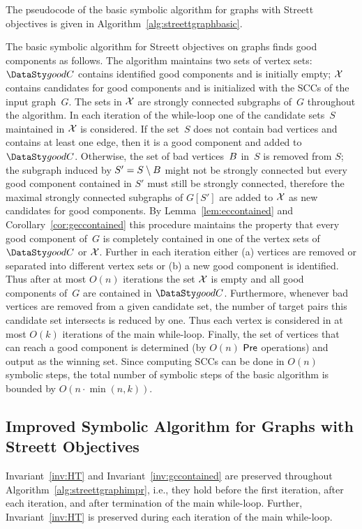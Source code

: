 The pseudocode of the basic symbolic algorithm for graphs with Streett
objectives is given in Algorithm~\ref{alg:streettgraphbasic}.

The basic symbolic algorithm for Streett objectives on graphs finds good components as follows.
The algorithm maintains two sets of vertex sets: $\goodC$ contains identified 
good components and is initially empty; $\mathcal{X}$ contains candidates for 
good components and is initialized with the SCCs of the input graph~$G$. The sets 
in $\mathcal{X}$ are strongly connected subgraphs of~$G$ throughout the 
algorithm. In each iteration of the while-loop one of the candidate sets~$S$
maintained in $\mathcal{X}$ is considered. If the set~$S$ does not contain
bad vertices and contains at least one edge, then it is a good component and 
added to $\goodC$. Otherwise, the set of bad vertices~$B$ in~$S$ is removed from $S$; the
subgraph induced by $S' = S \setminus B$ might not be strongly connected
but every good component contained in $S'$ must still be strongly connected,
therefore the maximal strongly connected subgraphs of $G[S']$ are added 
to $\mathcal{X}$ as new candidates for good components. By Lemma~\ref{lem:eccontained} 
and Corollary~\ref{cor:geccontained} this procedure maintains the property that 
every good component of~$G$ is completely contained in one of the vertex sets of
$\goodC$ or $\mathcal{X}$. Further in each iteration either (a) 
vertices are removed or separated into different vertex sets or (b) a new good 
component is identified. Thus after at most $O(n)$ iterations the set $\mathcal{X}$
is empty and all good components of~$G$ are contained in $\goodC$.
Furthermore, whenever bad vertices are removed from a given candidate set,
the number of target pairs this candidate set intersects is reduced by one.
Thus each vertex is considered in at most $O(k)$ iterations of the main while-loop.
Finally, the set of vertices that can reach a good component is determined (by $O(n)$ 
$\mathsf{Pre}$ operations) and output as the winning set.
Since computing SCCs can be done in $O(n)$ symbolic steps, the total number of
symbolic steps of the basic algorithm is bounded by $O(n \cdot \min(n, k))$.


\subsection{Improved Symbolic Algorithm for Graphs with Streett Objectives}

\begin{lemma}\label{lem:improvedgraphsinv}
Invariant~\ref{inv:HT} and Invariant~\ref{inv:gccontained} are preserved throughout
Algorithm~\ref{alg:streettgraphimpr}, i.e., they hold before the first iteration, after each
iteration, and after termination of the main while-loop. Further, Invariant~\ref{inv:HT}
is preserved during each iteration of the main while-loop.
\end{lemma}

